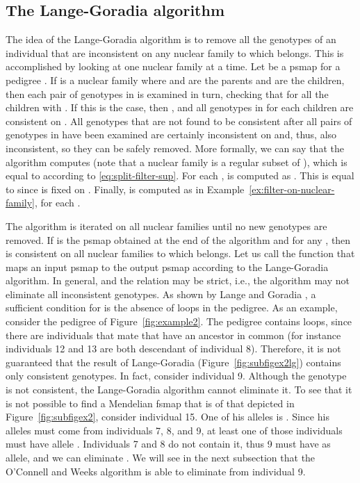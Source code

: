 \subsection{The Lange-Goradia algorithm}
\label{sec:lg}

The idea of the Lange-Goradia algorithm is to remove all the genotypes of an individual 
that are inconsistent on any nuclear family to which  belongs.
This is accomplished by looking at one nuclear family at a time.
Let  be a psmap for a pedigree .
If  is a nuclear
family where  and  are the parents and 
are the children, then each pair 
of genotypes in 
is examined in turn, checking that 
for all the children  with .
If this is the case, then ,  and all genotypes in 
for each children  are consistent on . 
All genotypes that are not found to be consistent after all pairs
of genotypes in 
have been examined are certainly inconsistent on  and, thus, also inconsistent, so they
can be safely removed.
More formally, we can say that the algorithm computes
 (note that a nuclear family
is a regular subset of ), which is equal to  according to \eqref{eq:split-filter-sup}. For each ,  is computed
as . This is equal to 
since  is fixed on .
Finally,  is computed as in Example~\ref{ex:filter-on-nuclear-family},
for each .

The algorithm is iterated on all nuclear families until no new genotypes are removed.
If  is the psmap obtained at the end of the algorithm and  for any ,
then  is consistent on all nuclear families to which  belongs.
Let us call 
the function that maps an input psmap  to the output psmap  according to the
Lange-Goradia algorithm.
In general,  and the relation may be strict, i.e.,
the algorithm may not eliminate all inconsistent genotypes. 
As shown by Lange and Goradia \cite{LangeGoradia1987}, a sufficient
condition for  is the absence of loops in the
pedigree. As an example, consider the pedigree of Figure~\ref{fig:example2}. The
pedigree contains loops, since there are individuals that mate that have an
ancestor in common (for instance individuals 12 and 13 are both descendant of
individual 8). Therefore, it is not guaranteed that the result of Lange-Goradia
(Figure~\ref{fig:subfigex2lg}) contains only consistent genotypes. In fact,
consider individual 9. Although the genotype  is not consistent, the
Lange-Goradia algorithm cannot eliminate it. To see that it is not possible to
find a Mendelian fsmap that is  of that depicted in
Figure~\ref{fig:subfigex2}, consider individual 15. One of his alleles is
. Since his alleles must come from individuals 7, 8, and 9, at least one of
those individuals must have allele . Individuals 7 and 8 do not contain it,
thus 9 must have  as allele, and we can eliminate . We will see in the
next subsection that the O'Connell and Weeks algorithm is able to eliminate
 from individual 9.

